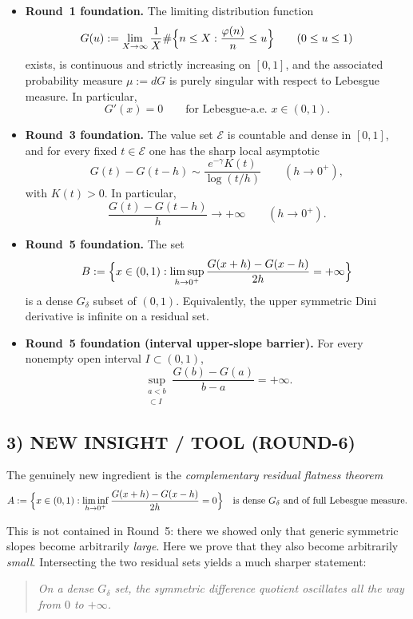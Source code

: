 \begin{itemize}
\item \textbf{Round~1 foundation.} The limiting distribution function
\[
G(u):=\lim_{X\to\infty}\frac1X\#\Bigl\{n\le X:\frac{\varphi(n)}n\le u\Bigr\}
\qquad(0\le u\le1)
\]
exists, is continuous and strictly increasing on $[0,1]$, and the associated probability measure
$\mu:=dG$ is purely singular with respect to Lebesgue measure. In particular,
\[
G'(x)=0\qquad\text{for Lebesgue-a.e. }x\in(0,1).
\]

\item \textbf{Round~3 foundation.} The value set $\mathcal E$ is countable and dense in $[0,1]$, and for every fixed
$t\in\mathcal E$ one has the sharp local asymptotic
\[
G(t)-G(t-h)\sim \frac{e^{-\gamma}K(t)}{\log(t/h)}
\qquad(h\to0^+),
\]
with $K(t)>0$. In particular,
\[
\frac{G(t)-G(t-h)}{h}\to+\infty
\qquad(h\to0^+).
\]

\item \textbf{Round~5 foundation.} The set
\[
B:=\Bigl\{x\in(0,1):\limsup_{h\to0^+}\frac{G(x+h)-G(x-h)}{2h}=+\infty\Bigr\}
\]
is a dense $G_\delta$ subset of $(0,1)$. Equivalently, the upper symmetric Dini derivative is infinite on a residual set.

\item \textbf{Round~5 foundation (interval upper-slope barrier).} For every nonempty open interval $I\subset(0,1)$,
\[
\sup_{\substack{a<b\\ [a,b]\subset I}}\frac{G(b)-G(a)}{b-a}=+\infty.
\]
\end{itemize}

\subsection{3) NEW INSIGHT / TOOL (ROUND-6)}

The genuinely new ingredient is the \emph{complementary residual flatness theorem}
\[
A:=\Bigl\{x\in(0,1):\liminf_{h\to0^+}\frac{G(x+h)-G(x-h)}{2h}=0\Bigr\}
\quad\text{is dense $G_\delta$ and of full Lebesgue measure.}
\]

This is not contained in Round~5: there we showed only that generic symmetric slopes become arbitrarily \emph{large}. Here we prove that they also become arbitrarily \emph{small}. Intersecting the two residual sets yields a much sharper statement:

\begin{quote}
\emph{On a dense $G_\delta$ set, the symmetric difference quotient oscillates all the way from $0$ to $+\infty$.}
\end{quote}

